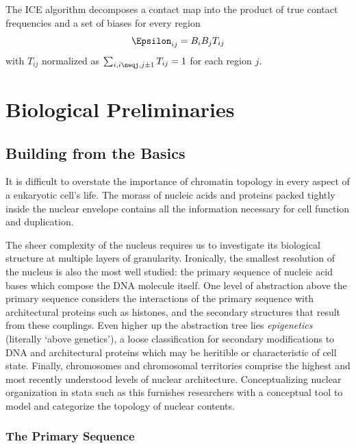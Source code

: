 \documentclass[phd,tocprelim]{cornell}
\begin{document}

The ICE algorithm decomposes a contact map into the product of true contact frequencies and a set of biases for every region
\[
  \Epsilon_{ij} = B_{i}B_{j}T_{ij}
\]
with $T_{ij}$ normalized as $\sum_{i,i\neqj,j\pm1}T_{ij} = 1$ for each region $j$.



\chapter{Biological Preliminaries}

\section{Building from the Basics}

It is difficult to overstate the importance of chromatin topology in
every aspect of a eukaryotic cell's life.  The morass of nucleic acids and
proteins packed tightly inside the nuclear envelope contains all the
information necessary for cell function and duplication.

The sheer complexity of the nucleus requires us to investigate its biological
structure at multiple layers of granularity.  Ironically, the smallest resolution
of the nucleus is also the most well studied: the primary sequence of nucleic
acid bases which compose the DNA molecule itself.  One level of abstraction
above the primary sequence considers the interactions of the primary sequence
with architectural proteins such as histones, and the secondary structures that
result from these couplings.  Even higher up the abstraction tree lies
\textit{epigenetics} (literally `above genetics'\cite{dictepi2014}), a loose
classification for secondary modifications to DNA and architectural proteins
which may be heritible or characteristic of cell state.  Finally, chromosomes
and chromosomal territories comprise the highest and most recently understood
levels of nuclear architecture.  Conceptualizing nuclear organization in
stata such as this furnishes researchers with a conceptual tool to model
and categorize the topology of nuclear contents.

\subsection{The Primary Sequence}
\end{document}
